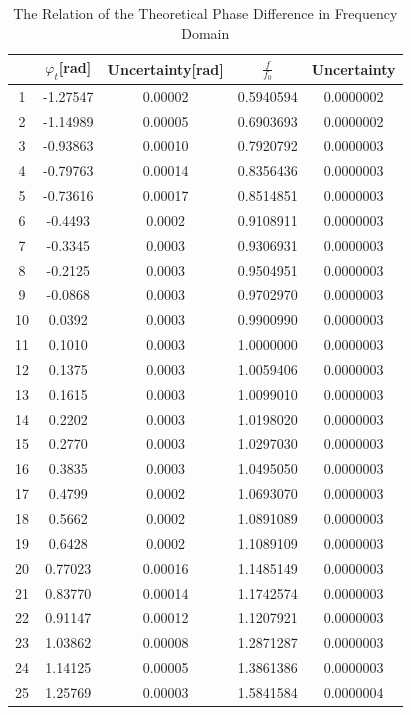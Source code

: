 \documentclass{my_template}
\renewcommand{\phi}{\varphi}
\begin{document}
    \begin{table}
        \centering
        \begin{tabular}{|c|c|c|c|c|}
            \hline
            &$\phi_t$[rad]&Uncertainty[rad]&$\frac{f}{f_0}$&Uncertainty\\\hline
            1&-1.27547&0.00002&0.5940594&0.0000002\\\hline
            2&-1.14989&0.00005&0.6903693&0.0000002\\\hline
            3&-0.93863&0.00010&0.7920792&0.0000003\\\hline
            4&-0.79763&0.00014&0.8356436&0.0000003\\\hline
            5&-0.73616&0.00017&0.8514851&0.0000003\\\hline
            6&-0.4493&0.0002&0.9108911&0.0000003\\\hline
            7&-0.3345&0.0003&0.9306931&0.0000003\\\hline
            8&-0.2125&0.0003&0.9504951&0.0000003\\\hline
            9&-0.0868&0.0003&0.9702970&0.0000003\\\hline
            10&0.0392&0.0003&0.9900990&0.0000003\\\hline
            11&0.1010&0.0003&1.0000000&0.0000003\\\hline
            12&0.1375&0.0003&1.0059406&0.0000003\\\hline
            13&0.1615&0.0003&1.0099010&0.0000003\\\hline
            14&0.2202&0.0003&1.0198020&0.0000003\\\hline
            15&0.2770&0.0003&1.0297030&0.0000003\\\hline
            16&0.3835&0.0003&1.0495050&0.0000003\\\hline
            17&0.4799&0.0002&1.0693070&0.0000003\\\hline
            18&0.5662&0.0002&1.0891089&0.0000003\\\hline
            19&0.6428&0.0002&1.1089109&0.0000003\\\hline
            20&0.77023&0.00016&1.1485149&0.0000003\\\hline
            21&0.83770&0.00014&1.1742574&0.0000003\\\hline
            22&0.91147&0.00012&1.1207921&0.0000003\\\hline
            23&1.03862&0.00008&1.2871287&0.0000003\\\hline
            24&1.14125&0.00005&1.3861386&0.0000003\\\hline
            25&1.25769&0.00003&1.5841584&0.0000004\\\hline
        \end{tabular}
        \caption{The Relation of the Theoretical Phase Difference in Frequency Domain}
        \label{tab:phit}
    \end{table}
\end{document}
